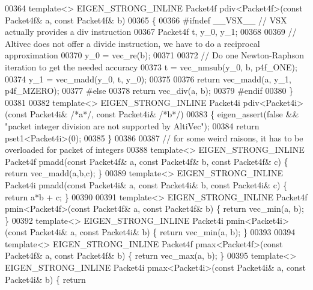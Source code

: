 \begin{DoxyCode}
{00364 \textcolor{keyword}{template}<> EIGEN\_STRONG\_INLINE Packet4f pdiv<Packet4f>(\textcolor{keyword}{const} Packet4f& a, \textcolor{keyword}{const} Packet4f& b)
00365 \{
00366 \textcolor{preprocessor}{#ifndef \_\_VSX\_\_  // VSX actually provides a div instruction}
00367   Packet4f t, y\_0, y\_1;
00368 
00369   \textcolor{comment}{// Altivec does not offer a divide instruction, we have to do a reciprocal approximation}
00370   y\_0 = vec\_re(b);
00371 
00372   \textcolor{comment}{// Do one Newton-Raphson iteration to get the needed accuracy}
00373   t   = vec\_nmsub(y\_0, b, p4f\_ONE);
00374   y\_1 = vec\_madd(y\_0, t, y\_0);
00375 
00376   \textcolor{keywordflow}{return} vec\_madd(a, y\_1, p4f\_MZERO);
00377 \textcolor{preprocessor}{#else}
00378   \textcolor{keywordflow}{return} vec\_div(a, b);
00379 \textcolor{preprocessor}{#endif}
00380 \}
00381 
00382 \textcolor{keyword}{template}<> EIGEN\_STRONG\_INLINE Packet4i pdiv<Packet4i>(\textcolor{keyword}{const} Packet4i& \textcolor{comment}{/*a*/}, \textcolor{keyword}{const} Packet4i& \textcolor{comment}{/*b*/})
00383 \{ eigen\_assert(\textcolor{keyword}{false} && \textcolor{stringliteral}{"packet integer division are not supported by AltiVec"});
00384   \textcolor{keywordflow}{return} pset1<Packet4i>(0);
00385 \}
00386 
00387 \textcolor{comment}{// for some weird raisons, it has to be overloaded for packet of integers}
00388 \textcolor{keyword}{template}<> EIGEN\_STRONG\_INLINE Packet4f pmadd(\textcolor{keyword}{const} Packet4f& a, \textcolor{keyword}{const} Packet4f& b, \textcolor{keyword}{const} Packet4f& c) \{ \textcolor{keywordflow}{
      return} vec\_madd(a,b,c); \}
00389 \textcolor{keyword}{template}<> EIGEN\_STRONG\_INLINE Packet4i pmadd(\textcolor{keyword}{const} Packet4i& a, \textcolor{keyword}{const} Packet4i& b, \textcolor{keyword}{const} Packet4i& c) \{ \textcolor{keywordflow}{
      return} a*b + c; \}
00390 
00391 \textcolor{keyword}{template}<> EIGEN\_STRONG\_INLINE Packet4f pmin<Packet4f>(\textcolor{keyword}{const} Packet4f& a, \textcolor{keyword}{const} Packet4f& b) \{ \textcolor{keywordflow}{return} 
      vec\_min(a, b); \}
00392 \textcolor{keyword}{template}<> EIGEN\_STRONG\_INLINE Packet4i pmin<Packet4i>(\textcolor{keyword}{const} Packet4i& a, \textcolor{keyword}{const} Packet4i& b) \{ \textcolor{keywordflow}{return} 
      vec\_min(a, b); \}
00393 
00394 \textcolor{keyword}{template}<> EIGEN\_STRONG\_INLINE Packet4f pmax<Packet4f>(\textcolor{keyword}{const} Packet4f& a, \textcolor{keyword}{const} Packet4f& b) \{ \textcolor{keywordflow}{return} 
      vec\_max(a, b); \}
00395 \textcolor{keyword}{template}<> EIGEN\_STRONG\_INLINE Packet4i pmax<Packet4i>(\textcolor{keyword}{const} Packet4i& a, \textcolor{keyword}{const} Packet4i& b) \{ \textcolor{keywordflow}{return} 
}
\end{DoxyCode}

